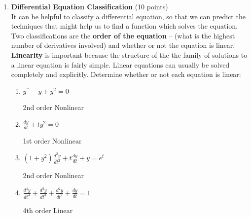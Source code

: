 \begin{enumerate}
  \item \textbf{Differential Equation Classification} (10 points)\\
  It can be helpful to classify a differential equation, so that we can predict the 
  techniques that might help us to find a function which solves the equation. Two 
  classifications are the \textbf{order of the equation} -- (what is the highest 
  number of derivatives involved) and whether or not the equation is linear. \\
  \textbf{Linearity} is important because the structure of the the family of solutions to a 
  linear equation is fairly simple. Linear equations can usually be solved 
  completely and explicitly. Determine whether or not each equation is linear:
  \begin{enumerate}[label=\arabic*.]
    \item $y^{\prime \prime}-y+y^2=0$\\
    \begin{subanswer}
      2nd order Nonlinear
    \end{subanswer}
    \item $\frac{d y}{d t}+t y^2=0$\\
    \begin{subanswer}
      1st order Nonlinear
    \end{subanswer}
    \item $\left(1+y^2\right) \frac{d^2 y}{d t^2}+t \frac{d y}{d t}+y=e^t$\\
    \begin{subanswer}
      2nd order Nonlinear
    \end{subanswer}
    \item $\frac{d^4 y}{d t^4}+\frac{d^3 y}{d t^3}+\frac{d^2 y}{d t^2}+\frac{d y}{d t}=1$\\
    \begin{subanswer}
      4th order Linear
    \end{subanswer}
  \end{enumerate}


\end{enumerate}
